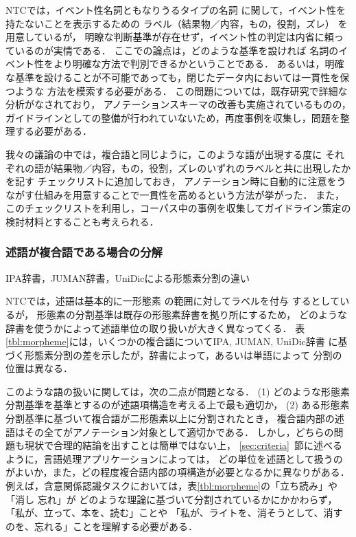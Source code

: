\documentclass[japanese]{jnlp_1.4}
\begin{document}
NTCでは，イベント性名詞ともなりうるタイプの名詞
に関して，イベント性を持たないことを表示するための
ラベル（結果物／内容，もの，役割，ズレ）
を用意しているが，
明瞭な判断基準が存在せず，イベント性の判定は内省に頼っているのが実情である．
ここでの論点は，どのような基準を設ければ
名詞のイベント性をより明確な方法で判別できるかということである．
あるいは，明確な基準を設けることが不可能であっても，閉じたデータ内においては一貫性を保つような
方法を模索する必要がある．
この問題については，既存研究で詳細な分析がなされており，
アノテーションスキーマの改善も実施されているものの\cite{飯田龍2010述語項構造}，
ガイドラインとしての整備が行われていないため，再度事例を収集し，問題を整理する必要がある．

我々の議論の中では，複合語と同じように，このような語が出現する度に
それぞれの語が結果物／内容，もの，役割，ズレのいずれのラベルと共に出現したかを記す
チェックリストに追加しておき，
アノテーション時に自動的に注意をうながす仕組みを用意することで一貫性を高めるという方法が挙がった．
また，このチェックリストを利用し，コーパス中の事例を収集してガイドライン策定の
検討材料とすることも考えられる．


\subsubsection{述語が複合語である場合の分解}
\label{sec:complex-word-decomposition}

\begin{table}[b]
\caption{IPA辞書，JUMAN辞書，UniDicによる形態素分割の違い}
\label{tbl:morpheme}

\end{table}

NTCでは，述語は基本的に一形態素
の範囲に対してラベルを付与
するとしているが，
形態素の分割基準は既存の形態素辞書を拠り所にするため，
どのような辞書を使うかによって述語単位の取り扱いが大きく異なってくる．
表\ref{tbl:morpheme}には，いくつかの複合語についてIPA, JUMAN, UniDic辞書
に基づく形態素分割の差を示したが，辞書によって，あるいは単語によって
分割の位置は異なる．

このような語の扱いに関しては，次の二点が問題となる．
(1) どのような形態素分割基準を基準とするのが述語項構造を考える上で最も適切か，
(2) ある形態素分割基準に基づいて複合語が二形態素以上に分割されたとき，
複合語内部の述語はその全てがアノテーション対象として適切かである．
しかし，どちらの問題も現状で合理的結論を出すことは簡単ではない上，
\ref{sec:criteria}~節に述べるように，言語処理アプリケーションによっては，
どの単位を述語として扱うのがよいか，また，どの程度複合語内部の項構造が必要となるかに異なりがある．
例えば，含意関係認識タスクにおいては，表\ref{tbl:morpheme}の「立ち読み」や「消し 忘れ」が
どのような理論に基づいて分割されているかにかかわらず，「私が、立って、本を、読む」ことや
「私が、ライトを、消そうとして、消すのを、忘れる」ことを理解する必要がある．
\end{document}
